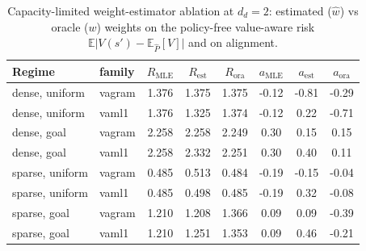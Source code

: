 \begin{table}[htbp]
\centering
\caption{Capacity-limited weight-estimator ablation at $d_d = 2$: estimated ($\hat w$) vs oracle ($w$) weights on the policy-free value-aware risk $\mathbb{E}\lvert V(s') - \mathbb{E}_{\hat P}[V]\rvert$ and on alignment.}
\label{tab:exp2b}
\begin{tabular}{llcccccc}
\toprule
Regime & family & $R_{\text{MLE}}$ & $R_{\text{est}}$ & $R_{\text{ora}}$ & $a_{\text{MLE}}$ & $a_{\text{est}}$ & $a_{\text{ora}}$ \\
\midrule
dense, uniform & vagram & 1.376 & 1.375 & 1.375 & -0.12 & -0.81 & -0.29 \\
dense, uniform & vaml1 & 1.376 & 1.325 & 1.374 & -0.12 & 0.22 & -0.71 \\
dense, goal & vagram & 2.258 & 2.258 & 2.249 & 0.30 & 0.15 & 0.15 \\
dense, goal & vaml1 & 2.258 & 2.332 & 2.251 & 0.30 & 0.40 & 0.11 \\
sparse, uniform & vagram & 0.485 & 0.513 & 0.484 & -0.19 & -0.15 & -0.04 \\
sparse, uniform & vaml1 & 0.485 & 0.498 & 0.485 & -0.19 & 0.32 & -0.08 \\
sparse, goal & vagram & 1.210 & 1.208 & 1.366 & 0.09 & 0.09 & -0.39 \\
sparse, goal & vaml1 & 1.210 & 1.251 & 1.353 & 0.09 & 0.46 & -0.21 \\
\bottomrule
\end{tabular}
\end{table}
